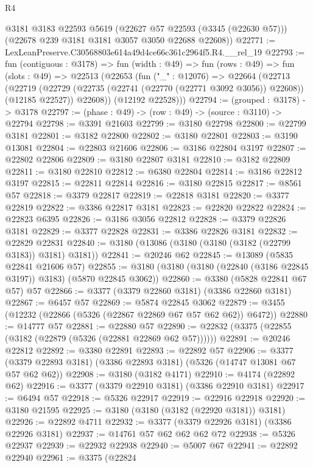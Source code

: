 \begin{lexlean}{R4}
\begin{coremodule}
      @3181
      @3183
      @22593
      @5619
      (@22627 @57 @22593 (@3345 (@22630 @57)))
      (@22678 @239 @3181 @3181 @3057 @3050 @22688 @22608))
@22771 := LexLeanPreserve.C30568803e614a49d4ce66c361c2964f5.R4.__rel_19
@22793 := fun (contiguous : @3178) =>
  fun (width : @49) =>
  fun (rows : @49) =>
  fun (slots : @49) =>
  @22513
    (@22653
      (fun ("_" : @12076) =>
      @22664
        (@22713
          (@22719
            (@22729 (@22735 (@22741 (@22770 (@22771 @3092 @3056)) @22608)) (@12185 @22527))
            @22608))
        (@12192 @22528)))
@22794 := (grouped : @3178) -> @3178
@22797 := (phase : @49) -> (row : @49) -> (source : @3110) -> @22794
@22798 := @3391 @21603
@22799 := @3180 @22798
@22800 := @22799 @3181
@22801 := @3182 @22800
@22802 := @3180 @22801
@22803 := @3190 @13081
@22804 := @22803 @21606
@22806 := @3186 @22804 @3197
@22807 := @22802 @22806
@22809 := @3180 @22807 @3181
@22810 := @3182 @22809
@22811 := @3180 @22810
@22812 := @6380 @22804
@22814 := @3186 @22812 @3197
@22815 := @22811 @22814
@22816 := @3180 @22815
@22817 := @8561 @57
@22818 := @3379 @22817
@22819 := @22818 @3181
@22820 := @3377 @22819
@22822 := @3386 @22817 @3181
@22823 := @22820 @22822
@22824 := @22823 @6395
@22826 := @3186 @3056 @22812
@22828 := @3379 @22826 @3181
@22829 := @3377 @22828
@22831 := @3386 @22826 @3181
@22832 := @22829 @22831
@22840 := @3180 (@13086 (@3180 (@3180 (@3182 (@22799 @3183)) @3181) @3181))
@22841 := @20246 @62
@22845 := @13089 (@5835 @22841 @21606 @57)
@22855 := @3180 (@3180 (@3180 (@22840 (@3186 @22845 @3197)) @3183) (@5870 @22845 @3062))
@22860 := @3380 (@5828 @22841 @67 @57) @57
@22866 := @3377 (@3379 @22860 @3181) (@3386 @22860 @3181)
@22867 := @6457 @57
@22869 := @5874 @22845 @3062
@22879 := @3455 (@12232 (@22866 (@5326 (@22867 @22869 @67 @57 @62 @62)) @6472))
@22880 := @14777 @57
@22881 := @22880 @57
@22890 := @22832 (@3375 (@22855 (@3182 (@22879 (@5326 (@22881 @22869 @62 @57))))))
@22891 := @20246 @22812
@22892 := @3380 @22891
@22893 := @22892 @57
@22906 := @3377 (@3379 @22893 @3181) (@3386 @22893 @3181) (@5326 (@14747 @13081 @67 @57 @62 @62))
@22908 := @3180 (@3182 @4171)
@22910 := @4174 (@22892 @62)
@22916 := @3377 (@3379 @22910 @3181) (@3386 @22910 @3181)
@22917 := @6494 @57
@22918 := @5326 @22917
@22919 := @22916 @22918
@22920 := @3180 @21595
@22925 := @3180 (@3180 (@3182 (@22920 @3181)) @3181)
@22926 := @22892 @4711
@22932 := @3377 (@3379 @22926 @3181) (@3386 @22926 @3181)
@22937 := @14761 @57 @62 @62 @62 @72
@22938 := @5326 @22937
@22939 := @22932 @22938
@22940 := @5007 @67
@22941 := @22892 @22940
@22961 := @3375
    (@22824

\end{coremodule}
\end{lexlean}
